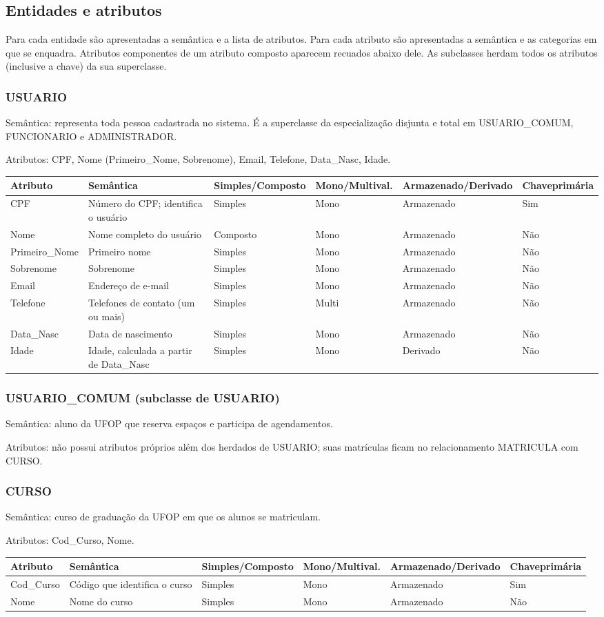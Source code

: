 \documentclass[11pt,a4paper]{article}
\makeatletter
\newenvironment{atributos}{%
  \par\footnotesize
  \noindent\begin{tabular}{@{}L{3.0cm} L{4.9cm} C{1.6cm} C{1.6cm} C{1.9cm} C{1.3cm}@{}}
  \toprule
  Atributo & Semântica & Simples/\newline Composto &
  Mono/\newline Multival. & \mbox{Armazenado/}\newline Derivado & Chave\newline primária \\
  \midrule}{%
  \bottomrule
  \end{tabular}\par\medskip}
\newcommand{\entidade}[3]{%
  \subsubsection*{#1}
  Semântica: #2\par
  Atributos: #3\par\smallskip}
\makeatother
\begin{document}
\subsection{Entidades e atributos}

Para cada entidade são apresentadas a semântica e a lista de atributos. Para
cada atributo são apresentadas a semântica e as categorias em que se enquadra.
Atributos componentes de um atributo composto aparecem recuados abaixo dele.
As subclasses herdam todos os atributos (inclusive a chave) da sua superclasse.

\entidade{USUARIO}
  {representa toda pessoa cadastrada no sistema. É a superclasse da
   especialização disjunta e total em USUARIO\_COMUM, FUNCIONARIO e ADMINISTRADOR.}
  {CPF, Nome (Primeiro\_Nome, Sobrenome), Email, Telefone, Data\_Nasc, Idade.}
\begin{atributos}
  CPF & Número do CPF; identifica o usuário & Simples & Mono & Armazenado & Sim \\
  Nome & Nome completo do usuário & Composto & Mono & Armazenado & Não \\
  \quad Primeiro\_Nome & Primeiro nome & Simples & Mono & Armazenado & Não \\
  \quad Sobrenome & Sobrenome & Simples & Mono & Armazenado & Não \\
  Email & Endereço de e-mail & Simples & Mono & Armazenado & Não \\
  Telefone & Telefones de contato (um ou mais) & Simples & Multi & Armazenado & Não \\
  Data\_Nasc & Data de nascimento & Simples & Mono & Armazenado & Não \\
  Idade & Idade, calculada a partir de Data\_Nasc & Simples & Mono & Derivado & Não \\
\end{atributos}

\entidade{USUARIO\_COMUM (subclasse de USUARIO)}
  {aluno da UFOP que reserva espaços e participa de agendamentos.}
  {não possui atributos próprios além dos herdados de USUARIO; suas
   matrículas ficam no relacionamento MATRICULA com CURSO.}

\entidade{CURSO}
  {curso de graduação da UFOP em que os alunos se matriculam.}
  {Cod\_Curso, Nome.}
\begin{atributos}
  Cod\_Curso & Código que identifica o curso & Simples & Mono & Armazenado & Sim \\
  Nome & Nome do curso & Simples & Mono & Armazenado & Não \\
\end{atributos}
\end{document}
